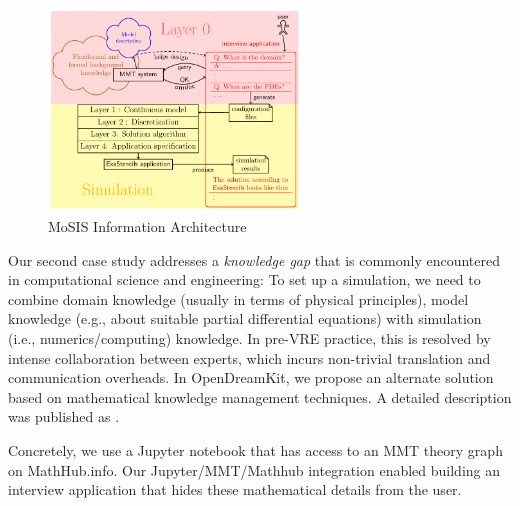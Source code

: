 \begin{figure}[ht]\centering
  \includegraphics[width=0.6\textwidth]{../D4.11/proto}
  \caption{MoSIS Information Architecture}\label{fig:prototype}
\end{figure}

Our second case study addresses a \emph{knowledge gap} that is commonly encountered in computational science and engineering:
To set up a simulation, we need to combine domain knowledge (usually in terms of physical principles), model knowledge (e.g., about suitable partial differential equations) with simulation (i.e., numerics/computing) knowledge.
In pre-VRE practice, this is resolved by intense collaboration between experts, which incurs non-trivial translation and communication overheads.
In OpenDreamKit, we propose an alternate solution based on mathematical knowledge management techniques.
A detailed description was published as \cite{PolKohKoe:kacse18}.

Concretely, we use a Jupyter notebook that has access to an MMT theory graph on MathHub.info.  Our Jupyter/MMT/Mathhub integration enabled building an interview application that hides these mathematical details from the user.



